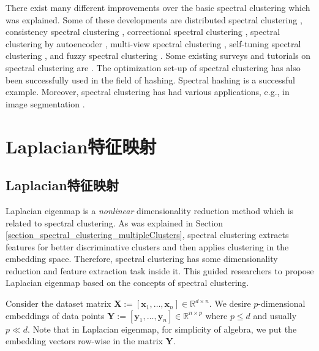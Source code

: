 \documentclass[lang=cn,10pt]{gorgeousnbook}
\numberwithin{equation}{section}%
\numberwithin{figure}{section}%
\begin{document}
There exist many different improvements over the basic spectral clustering which was explained. Some of these developments are distributed spectral clustering \cite{chen2010parallel}, consistency spectral clustering \cite{von2008consistency}, correctional spectral clustering \cite{blaschko2008correlational}, spectral clustering by autoencoder \cite{banijamali2017fast}, multi-view spectral clustering \cite{kumar2011co,kumar2011co2,yin2019multi}, self-tuning spectral clustering \cite{zelnik2004self}, and fuzzy spectral clustering \cite{yang2016fuzzy}. 
Some existing surveys and tutorials on spectral clustering are  \cite{von2007tutorial,guan2008survey,nascimento2011spectral,guo2012survey}. The optimization set-up of spectral clustering has also been successfully used in the field of hashing. Spectral hashing \cite{weiss2008spectral} is a successful example. 
Moreover, spectral clustering has had various applications, e.g., in image segmentation \cite{yang2016novel}.



\section{Laplacian特征映射}\label{section_Laplacian_eigenmap}

\subsection{Laplacian特征映射}

Laplacian eigenmap \cite{belkin2001laplacian,belkin2003laplacian} is a \textit{nonlinear} dimensionality reduction method which is related to spectral clustering. 
As was explained in Section \ref{section_spectral_clustering_multipleClusters}, spectral clustering extracts features for better discriminative clusters and then applies clustering in the embedding space. Therefore, spectral clustering has some dimensionality reduction and feature extraction task inside it. This guided researchers to propose Laplacian eigenmap based on the concepts of spectral clustering. 

Consider the dataset matrix $\boldsymbol{X} := [\boldsymbol{x}_1, \dots, \boldsymbol{x}_n] \in \mathbb{R}^{d \times n}$. We desire $p$-dimensional embeddings of data points $\boldsymbol{Y} := [\boldsymbol{y}_1, \dots, \boldsymbol{y}_n] \in \mathbb{R}^{n \times p}$ where $p \leq d$ and usually $p \ll d$. Note that in Laplacian eigenmap, for simplicity of algebra, we put the embedding vectors row-wise in the matrix $\boldsymbol{Y}$. 
\end{document}
